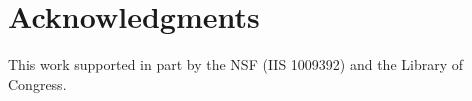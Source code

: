 \section{Acknowledgments}
This work supported in part by the NSF (IIS 1009392) and the Library of 
Congress.


%

 
%  







